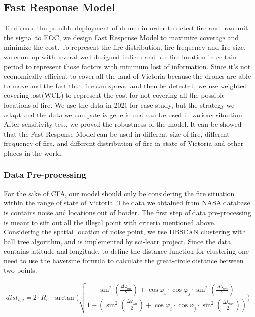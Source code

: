 \documentclass[../main]{subfiles}
\begin{document}
\subsection{Fast Response Model}
To discuss the possible deployment of drones in order to detect fire and transmit the signal to EOC,
 we design Fast Response Model to maximize coverage and minimize the cost. To represent the fire distribution,
  fire frequency and fire size, we come up with several well-designed indices and use fire location in certain
   period to represent those factors with minimum lost of information.  Since it's not economically
    efficient to cover all the land of Victoria because the drones are able to move and the fact that fire can
     spread and then be detected, we use weighted covering lost(WCL) to represent the cost for not covering 
     all the possible locations of fire. We use the data in 2020 for case study, but the strategy we adapt and
      the data we compute is generic and can be used in various situation. \\

      After sensitivity test, we proved the robustness of the model. It can be showed that the Fast Response Model can be used in different size of fire, different frequency of fire, and different distribution of fire in state of Victoria and other places in the world.
\subsubsection{Data Pre-processing}
For the sake of CFA, our model should only be considering the fire situation within the range of state of Victoria. The data we obtained from NASA database is contains noise and locations out of border. The first step of data pre-processing is meant to sift out all the illegal point with criteria mentioned above. Considering the spatial location of noise point,
 we use DBSCAN clustering with ball tree \cite{enwiki:1065597644} algorithm, and is implemented by sci-learn 
 project\cite{scikit-learn}. 
 Since the data contains latitude and longitude, 
 to define the distance function for clustering one need to use the haversine formula\cite{haversine} to calculate the great-circle distance between two points.
 


 \begin{equation}
      dist_{i,j}=2\cdot R_{e} \cdot \arctan \Bigg(\sqrt{\frac {\sin^2(\frac {\Delta \varphi_{lat} }{2})+\cos\varphi _i\cdot 
      \cos \varphi _j \cdot \sin^2({ \frac {\Delta \lambda_{lon}} {2} })}
      {1-(\sin^2(\frac {\Delta \varphi_{lat} }{2})+\cos\varphi _i\cdot 
      \cos \varphi _j \cdot \sin^2({ \frac {\Delta \lambda_{lon}} {2} }))}}\Bigg)
\end{equation}
\end{document}
